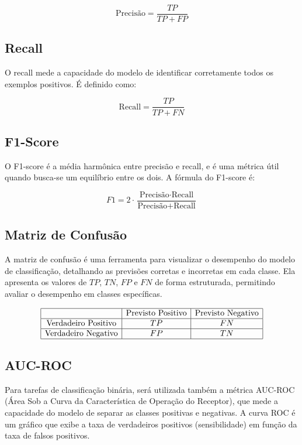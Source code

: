 \begin{equation}
    \text{Precisão} = \frac{TP}{TP + FP}
\end{equation}

\subsection{Recall}
O recall mede a capacidade do modelo de identificar corretamente todos os exemplos positivos. É definido como:

\begin{equation}
    \text{Recall} = \frac{TP}{TP + FN}
\end{equation}

\subsection{F1-Score}
O F1-score é a média harmônica entre precisão e recall, e é uma métrica útil quando busca-se um equilíbrio entre os dois. A fórmula do F1-score é:

\begin{equation}
    F1 = 2 \cdot \frac{\text{Precisão} \cdot \text{Recall}}{\text{Precisão} + \text{Recall}}
\end{equation}

\subsection{Matriz de Confusão}
A matriz de confusão é uma ferramenta para visualizar o desempenho do modelo de classificação, detalhando as previsões corretas e incorretas em cada classe. Ela apresenta os valores de $TP$, $TN$, $FP$ e $FN$ de forma estruturada, permitindo avaliar o desempenho em classes específicas.

\[
\begin{array}{|c|c|c|}
\hline
 & \text{Previsto Positivo} & \text{Previsto Negativo} \\
\hline
\text{Verdadeiro Positivo} & TP & FN \\
\hline
\text{Verdadeiro Negativo} & FP & TN \\
\hline
\end{array}
\]

\subsection{AUC-ROC}
Para tarefas de classificação binária, será utilizada também a métrica AUC-ROC (Área Sob a Curva da Característica de Operação do Receptor), que mede a capacidade do modelo de separar as classes positivas e negativas. A curva ROC é um gráfico que exibe a taxa de verdadeiros positivos (sensibilidade) em função da taxa de falsos positivos.

